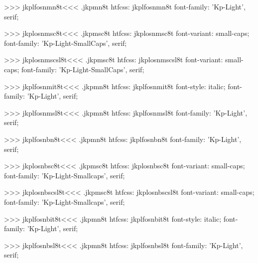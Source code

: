 >>>
\<jkplfosnmn8t\><<<
.jkpmn8t
htfcss:  jkplfosnmn8t  font-family: 'Kp-Light', serif;

>>>
\<jkplosnmsc8t\><<<
.jkpmsc8t
htfcss:  jkplosnmsc8t  font-variant: small-caps; font-family: 'Kp-Light-SmallCaps', serif;

>>>
\<jkplosnmscsl8t\><<<
.jkpmsc8t
htfcss:  jkplosnmscsl8t  font-variant: small-caps; font-family: 'Kp-Light-SmallCaps', serif;

>>>
\<jkplfosnmit8t\><<<
.jkpmn8t
htfcss:  jkplfosnmit8t  font-style: italic; font-family: 'Kp-Light', serif;

>>>
\<jkplfosnmsl8t\><<<
.jkpmn8t
htfcss:  jkplfosnmsl8t  font-family: 'Kp-Light', serif;

>>>
\<jkplfosnbn8t\><<<
.jkpmn8t
htfcss:  jkplfosnbn8t  font-family: 'Kp-Light', serif;

>>>
\<jkplosnbsc8t\><<<
.jkpmsc8t
htfcss:  jkplosnbsc8t  font-variant: small-caps; font-family: 'Kp-Light-Smallcaps', serif;

>>>
\<jkplosnbscsl8t\><<<
.jkpmsc8t
htfcss:  jkplosnbscsl8t  font-variant: small-caps; font-family: 'Kp-Light-Smallcaps', serif;

>>>
\<jkplfosnbit8t\><<<
.jkpmn8t
htfcss:  jkplfosnbit8t  font-style: italic; font-family: 'Kp-Light', serif;

>>>
\<jkplfosnbsl8t\><<<
.jkpmn8t
htfcss:  jkplfosnbsl8t  font-family: 'Kp-Light', serif;

